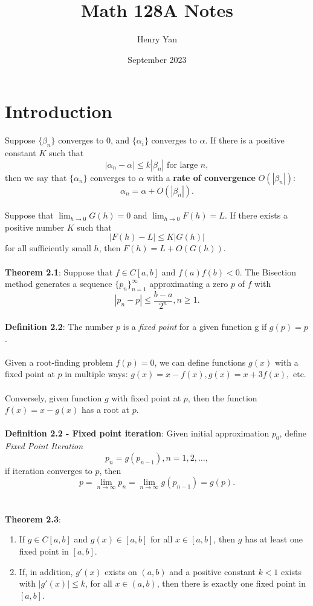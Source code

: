 \documentclass{article}
\title{Math 128A Notes}
\author{Henry Yan}
\date{September 2023}
\begin{document}
\maketitle

\section*{Introduction}
Suppose $\{\beta_n\}$ converges to 0, and $\{\alpha_i\}$ converges to $\alpha$. If there is a positive constant $K$ such that $$|\alpha_n - \alpha| \leq k |\beta_n| \text{ for large } n,$$ then we say that $\{\alpha_n\}$ converges to $\alpha$ with a \textbf{rate of convergence} $O(|\beta_n|)$: $$\alpha_n = \alpha + O(|\beta_n|).$$ \\
Suppose that $\lim_{h \rightarrow 0} G(h) = 0$ and $\lim_{h \rightarrow 0} F(h) = L$. If there exists a positive number $K$ such that $$|F(h) - L| \leq K|G(h)|$$ for all sufficiently small $h$, then $F(h) = L + O(G(h))$. \\ \\
\textbf{Theorem 2.1}: Suppose that $f \in C[a, b]$ and $f(a)f(b) < 0$. The Bisection method generates a sequence $\{p_n\}_{n = 1}^\infty$ approximating a zero $p$ of $f$ with $$|p_n - p| \leq \frac{b - a}{2^n}, n \geq 1.$$ \\
\textbf{Definition 2.2}: The number $p$ is a \textit{fixed point} for a given function g if $g(p) = p$. \\ \\
Given a root-finding problem $f(p) = 0$, we can define
functions $g(x)$ with a fixed point at $p$ in multiple ways: $g(x) = x - f(x), g (x) = x + 3f(x), \text{ etc}$. \\ \\
Conversely, given function $g$ with fixed point at $p$, then the
function $f(x) = x - g(x)$ has a root at $p.$ \\ \\
\textbf{Definition 2.2 - Fixed point iteration}: Given initial approximation $p_0$, define \textit{Fixed Point Iteration} $$p_n = g (p_{n - 1}), n = 1, 2, \dots,$$ if iteration converges to $p$, then $$p = \lim_{n \rightarrow \infty} p_n = \lim_{n \rightarrow \infty} g(p_{n - 1}) = g(p).$$ \\ \\
\textbf{Theorem 2.3}: \begin{enumerate}
    \item If $g \in C[a, b]$ and $g(x) \in [a,b]$ for all $x \in [a, b]$, then $g$ has at least one fixed point in $[a, b]$.
    \item If, in addition, $g'(x)$ exists on $(a, b)$ and a positive constant $k < 1$ exists with $|g'(x)| \leq k$, for all $x \in (a, b)$, then there is exactly one fixed point in $[a,b]$.
\end{enumerate} $ $ \\
\end{document}
